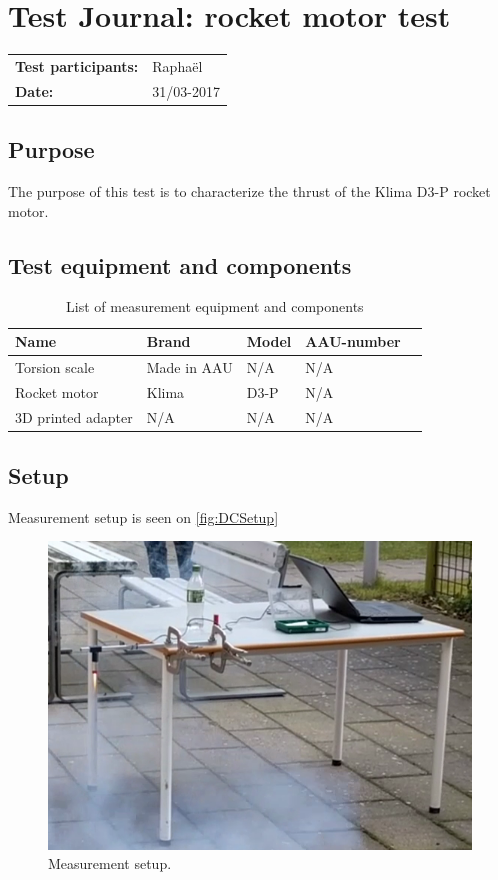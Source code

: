 \graphicspath{{figures/design/}}
\chapter{Test Journal: rocket motor test}\label{ThrusterTest}
\label{ssc:ThrusterTest}
\begin{table}[!h]
\begin{tabular}{l l}
\textbf{Test participants:} & Raphaël  \\
\textbf{Date:}  & 31/03-2017
\end{tabular}
\end{table}

\section*{Purpose}
The purpose of this test is to characterize the thrust of the Klima D3-P rocket motor.
\section*{Test equipment and components}
\begin{table}[h]
	\centering
	\caption{List of measurement equipment and components}\label{tab_appendix:SRB_equip}

	\begin{tabularx}{\textwidth}{lXXXX}
		Name 				& Brand	& Model & AAU-number									\\ \toprule \rowcolor{lightGrey}
		Torsion scale	& Made in AAU & N/A & N/A 	\\
		Rocket motor	& Klima &  D3-P & N/A \\ \rowcolor{lightGrey}
		3D printed adapter & N/A & N/A & N/A
	\end{tabularx}
\end{table}
\section*{Setup}
Measurement setup is seen on \autoref{fig:DCSetup} \
\begin{figure} [h]
\centering
\includegraphics[width=0.8\linewidth]{figures/appendix/srb_test_setup.png}
\caption{Measurement setup.}
\label{fig:SRBSetup}
\end{figure}

